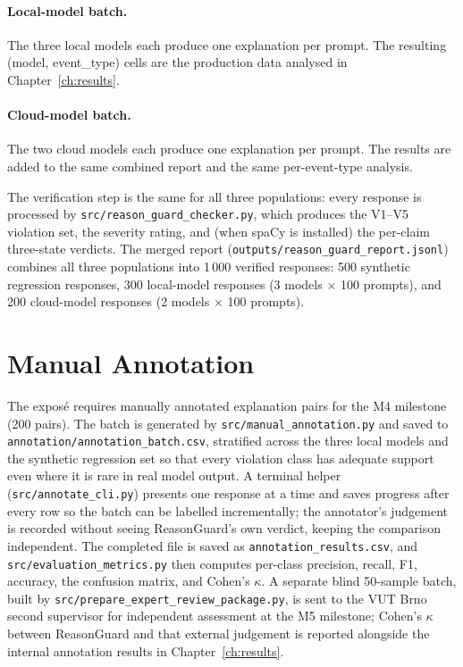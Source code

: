 \paragraph{Local-model batch.}
The three local models each produce one explanation per prompt. The
resulting (model, event\_type) cells are the production data analysed in
Chapter~\ref{ch:results}.

\paragraph{Cloud-model batch.}
The two cloud models each produce one explanation per prompt. The results
are added to the same combined report and the same per-event-type analysis.

The verification step is the same for all three populations: every response
is processed by \texttt{src/reason\_guard\_checker.py}, which produces the
V1--V5 violation set, the severity rating, and (when spaCy is installed) the
per-claim three-state verdicts. The merged report
(\texttt{outputs/reason\_guard\_report.jsonl}) combines all three
populations into 1\,000 verified responses: 500 synthetic regression
responses, 300 local-model responses (3 models $\times$ 100 prompts), and
200 cloud-model responses (2 models $\times$ 100 prompts).

\section{Manual Annotation}
\label{sec:manual-annotation}

The exposé requires manually annotated explanation pairs for the M4
milestone (200 pairs). The batch is generated by
\texttt{src/manual\_annotation.py} and saved to
\texttt{annotation/annotation\_batch.csv}, stratified across the three local
models and the synthetic regression set so that every violation class has
adequate support even where it is rare in real model output. A terminal
helper (\texttt{src/annotate\_cli.py}) presents one response at a time and
saves progress after every row so the batch can be labelled incrementally;
the annotator's judgement is recorded without seeing ReasonGuard's own
verdict, keeping the comparison independent. The completed file is saved as
\texttt{annotation\_results.csv}, and \texttt{src/evaluation\_metrics.py}
then computes per-class precision, recall, F1, accuracy, the confusion
matrix, and Cohen's $\kappa$. A separate blind 50-sample batch, built by
\texttt{src/prepare\_expert\_review\_package.py}, is sent to the VUT Brno
second supervisor for independent assessment at the M5 milestone; Cohen's
$\kappa$ between ReasonGuard and that external judgement is reported
alongside the internal annotation results in Chapter~\ref{ch:results}.

